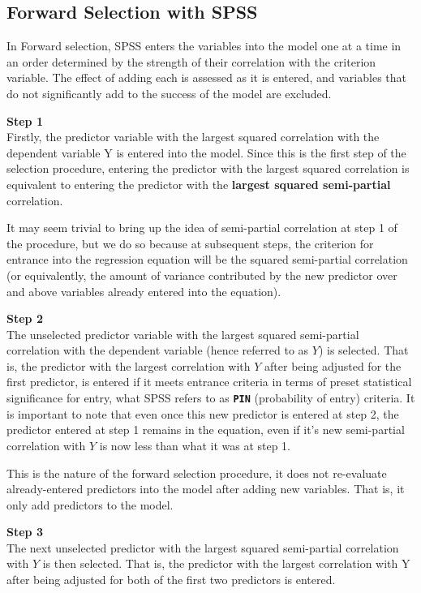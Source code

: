 \documentclass[a4paper,12pt]{article}
\begin{document}
\subsection{Forward Selection with SPSS}
In Forward selection, SPSS enters the variables into the model one at a time in an
order determined by the strength of their correlation with the criterion variable. The effect of adding each is assessed as it is entered, and variables that do not significantly add to the success of the model are excluded.

\noindent \textbf{Step 1}\\
Firstly, the predictor variable with the largest squared correlation with the dependent variable Y is entered into the model. Since this is the first step of the selection procedure, entering the predictor with the largest squared correlation is equivalent to entering the predictor with the \textbf{largest squared semi-partial} correlation. 

\noindent It may seem trivial to bring up the idea of semi-partial correlation at step 1 of the procedure, but we do so because at subsequent steps, the criterion for entrance into the regression equation will be the squared semi-partial correlation (or equivalently, the amount of variance contributed by the new predictor over and above variables already entered into the equation).

\noindent  \textbf{Step 2}\\
The unselected predictor variable with the largest squared semi-partial correlation with the dependent variable (hence referred to as $Y$) is selected. That is, the predictor with the largest correlation with $Y$ after being adjusted for the first predictor, is entered if it meets entrance criteria in terms of preset statistical significance for entry, what SPSS refers to as
\textbf{\texttt{PIN}} (probability of entry) criteria. 
It is important to note that even once this new predictor is entered at step 2, the predictor entered at step 1 remains in the equation, even if it's new semi-partial correlation with $Y$ is now less than what it was at step 1. 

\noindent This is the nature of the forward selection procedure, it does not re-evaluate already-entered predictors into the model after adding new variables. That is, it only add predictors to the model. 

\noindent  \textbf{Step 3}\\
The next unselected predictor with the largest squared semi-partial correlation with $Y$ is then selected. That is, the predictor with the largest correlation with Y after being adjusted for both of the first two predictors is entered. 
\end{document}
